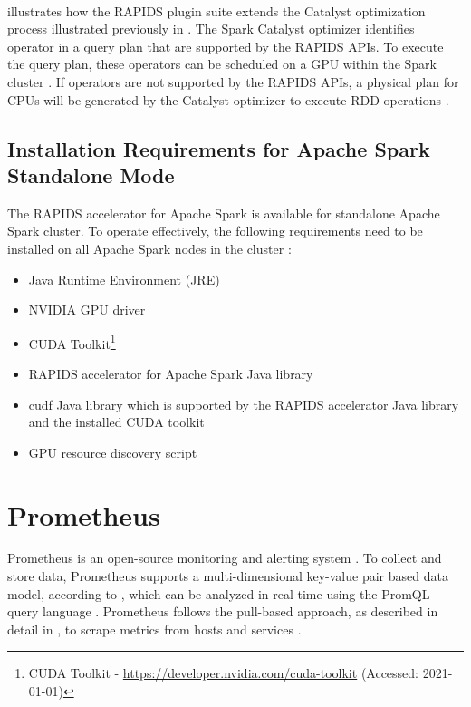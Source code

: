 \paragraph{} illustrates how the RAPIDS plugin suite extends the Catalyst optimization process illustrated previously in .
The Spark Catalyst optimizer identifies operator in a query plan that are supported by the RAPIDS APIs. To execute the query plan, these operators can be scheduled on a GPU within the Spark cluster \cite{Mcdonald2020SparkRapids}. If operators are not supported by the RAPIDS APIs, a physical plan for CPUs will be generated by the Catalyst optimizer to execute RDD operations \cite{Mcdonald2020SparkRapids}.


\subsection{Installation Requirements for Apache Spark Standalone Mode}
\label{subsec:04_rapids_req}
The RAPIDS accelerator for Apache Spark is available for standalone Apache Spark cluster. To operate effectively, the following requirements need to be installed on all Apache Spark nodes in the cluster \cite{SparkRapids2020Docs}:
\begin{itemize}
\item Java Runtime Environment (JRE)
\item NVIDIA GPU driver
\item CUDA Toolkit\footnote{CUDA Toolkit - \url{https://developer.nvidia.com/cuda-toolkit} (Accessed: 2021-01-01)}
\item RAPIDS accelerator for Apache Spark Java library
\item cudf Java library which is supported by the RAPIDS accelerator Java library and the installed CUDA toolkit
\item GPU resource discovery script
\end{itemize}


\section{Prometheus}
\label{sec:04_prom}
Prometheus is an open-source monitoring and alerting system \cite{Prom2020Docs}.
To collect and store data, Prometheus supports a multi-dimensional key-value pair based data model, according to , which can be analyzed in real-time using the PromQL query language \cite{Pandey2020Monitoring}.
Prometheus follows the pull-based approach, as described in detail in , to scrape metrics from hosts and services \cite{Bastos2019Prom}.


